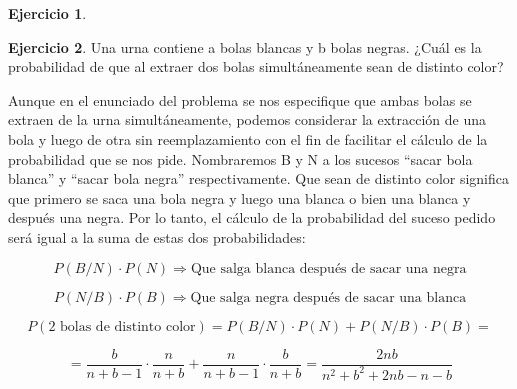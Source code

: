 \documentclass[a4paper, 12pt]{article}
\theoremstyle{definition}
\newtheorem{ej}{Ejercicio}
\begin{document}
\newpage

\begin{ej}
\end{ej}

\begin{ej}
Una urna contiene a bolas blancas y b bolas negras. ¿Cuál es la probabilidad de que al extraer
dos bolas simultáneamente sean de distinto color?

\medskip

Aunque en el enunciado del problema se nos especifique que ambas bolas se extraen de la urna simultáneamente, podemos considerar la extracción de una bola y luego de otra sin reemplazamiento con el fin  de facilitar el cálculo de la probabilidad que se nos pide. Nombraremos B y N a los sucesos ``sacar bola blanca'' y ``sacar bola negra'' respectivamente. Que sean de distinto color significa que primero se saca una bola negra y luego una blanca o bien una blanca y después una negra. Por lo tanto, el cálculo de la probabilidad del suceso pedido será igual a la suma de estas dos probabilidades:

\[
	P(B/N)\cdot P(N) \Rightarrow \text{Que salga blanca después de sacar una negra}
\]

\[
	P(N/B)\cdot P(B) \Rightarrow \text{Que salga negra después de sacar una blanca}
\]

\[
	P(\text{2 bolas de distinto color}) = P(B/N)\cdot P(N) + P(N/B)\cdot P(B) =
\]

\[
	= \frac{b}{n+b-1}\cdot\frac{n}{n+b} + \frac{n}{n+b-1}\cdot\frac{b}{n+b} = \frac{2nb}{n^2+b^2+2nb-n-b}
\]

\end{ej}

\medskip
\end{document}
